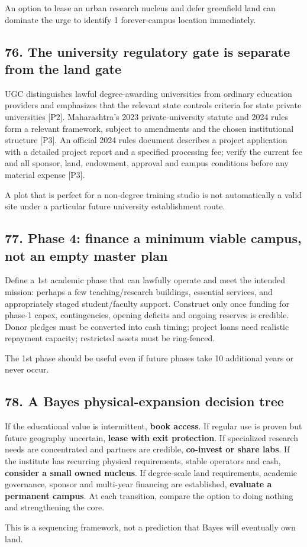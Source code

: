 An option to lease an urban research nucleus and defer greenfield land can dominate the urge to identify 1 forever-campus location immediately.


\subsection{76. The university regulatory gate is separate from the land gate}

UGC distinguishes lawful degree-awarding universities from ordinary education providers and emphasizes that the relevant state controls criteria for state private universities [P2]. Maharashtra's 2023 private-university statute and 2024 rules form a relevant framework, subject to amendments and the chosen institutional structure [P3]. An official 2024 rules document describes a project application with a detailed project report and a specified processing fee; verify the current fee and all sponsor, land, endowment, approval and campus conditions before any material expense [P3].

A plot that is perfect for a non-degree training studio is not automatically a valid site under a particular future university establishment route.


\subsection{77. Phase 4: finance a minimum viable campus, not an empty master plan}

Define a 1st academic phase that can lawfully operate and meet the intended mission: perhaps a few teaching/research buildings, essential services, and appropriately staged student/faculty support. Construct only once funding for phase-1 capex, contingencies, opening deficits and ongoing reserves is credible. Donor pledges must be converted into cash timing; project loans need realistic repayment capacity; restricted assets must be ring-fenced.

The 1st phase should be useful even if future phases take 10 additional years or never occur.


\subsection{78. A Bayes physical-expansion decision tree}

If the educational value is intermittent, \textbf{book access}. If regular use is proven but future geography uncertain, \textbf{lease with exit protection}. If specialized research needs are concentrated and partners are credible, \textbf{co-invest or share labs}. If the institute has recurring physical requirements, stable operators and cash, \textbf{consider a small owned nucleus}. If degree-scale land requirements, academic governance, sponsor and multi-year financing are established, \textbf{evaluate a permanent campus}. At each transition, compare the option to doing nothing and strengthening the core.

This is a sequencing framework, not a prediction that Bayes will eventually own land.
